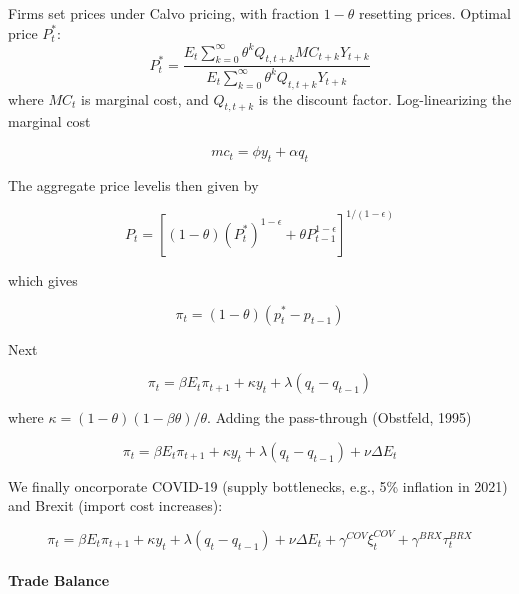 \documentclass[
]{article}
\begin{document}
Firms set prices under Calvo pricing, with fraction \( 1-\theta \) resetting prices. Optimal price \( P_t^* \):
\begin{equation*}
P_t^* = \frac{E_t \sum_{k=0}^\infty \theta^k Q_{t,t+k} MC_{t+k} Y_{t+k}}{E_t \sum_{k=0}^\infty \theta^k Q_{t,t+k} Y_{t+k}}
\end{equation*}
where \( MC_t \) is marginal cost, and \( Q_{t,t+k} \) is the discount factor. Log-linearizing the marginal cost

\begin{equation*}
mc_t = \phi y_t + \alpha q_t
\end{equation*}

The aggregate price levelis then given by

\begin{equation*}
P_t = \left[ (1-\theta) (P_t^*)^{1-\epsilon} + \theta P_{t-1}^{1-\epsilon} \right]^{1/(1-\epsilon)}
\end{equation*}

which gives

\begin{equation*}
\pi_t = (1-\theta)(p_t^* - p_{t-1})
\end{equation*}

Next 

\begin{equation*}
\pi_t = \beta E_t \pi_{t+1} + \kappa y_t + \lambda (q_t - q_{t-1})
\end{equation*}

where \( \kappa = (1-\theta)(1-\beta\theta)/\theta \). Adding the pass-through (Obstfeld, 1995)

\begin{equation*}
\pi_t = \beta E_t \pi_{t+1} + \kappa y_t + \lambda (q_t - q_{t-1}) + \nu \Delta E_t
\end{equation*}

We finally oncorporate COVID-19 (supply bottlenecks, e.g., 5\% inflation in 2021) and Brexit (import cost increases):

\begin{equation}
\pi_t = \beta E_t \pi_{t+1} + \kappa y_t + \lambda (q_t - q_{t-1}) + \nu \Delta E_t + \gamma^{COV} \xi_t^{COV} + \gamma^{BRX} \tau_t^{BRX}
\label{eq:phillips}
\end{equation}

\paragraph*{Trade Balance}
\end{document}
